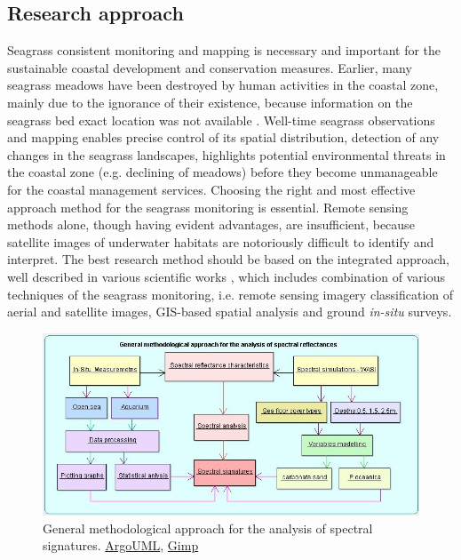 \documentclass[11pt]{article}
\begin{document}
\subsection{Research approach}
Seagrass consistent monitoring and mapping is necessary and important for the sustainable coastal
development and conservation measures. Earlier, many seagrass meadows have been destroyed by
human activities in the coastal zone, mainly due to the ignorance of their existence, because
information on the seagrass bed exact location was not available \cite{Choo06}\label{Choo06}. Well-time seagrass
observations and mapping enables precise control of its spatial distribution, detection of any changes
in the seagrass landscapes, highlights potential environmental threats in the coastal zone (e.g.
declining of meadows) before they become unmanageable for the coastal management services.
Choosing the right and most effective approach method for the seagrass monitoring is essential.
Remote sensing methods alone, though having evident advantages, are insufficient, because satellite
images of underwater habitats are notoriously difficult to identify and interpret. The best research
method should be based on the integrated approach, well described in various scientific works \cite{Brown02,Montefalcone06,Kirkman96}\label{Brown02} \label{Montefalcone06} \label{Kirkman96}, which includes combination of various
techniques of the seagrass monitoring, i.e. remote sensing imagery classification of aerial and satellite
images, GIS-based spatial analysis and ground \textit{in-situ} surveys.
\begin{figure}[H]
	\centering
	\includegraphics[scale=0.48]{UML_ClassDiagram.jpg}
	\caption{General methodological approach for the analysis of spectral signatures. \href{http://argouml.tigris.org/}{ArgoUML}, \href{http://www.gimp.org/}{Gimp}}
	\label{fig:1.10}
\end{figure}
\end{document}
